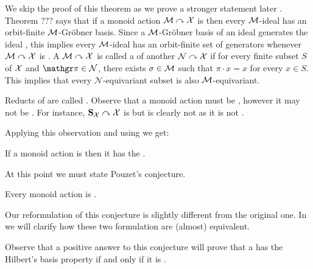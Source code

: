 %
We skip the proof of this theorem as we prove a stronger statement later .
Theorem ??? says that if a monoid action $\mathcal{M}\curvearrowright\mathcal{X}$ is  then every $\mathcal{M}$-ideal has an orbit-finite $\mathcal{M}$-Gr\"{o}bner basis.
Since a $\mathcal{M}$-Gr\"{o}bner basis of an ideal generates the ideal ,
this implies every $\mathcal{M}$-ideal has an orbit-finite set of generators whenever $\mathcal{M}\curvearrowright\mathcal{X}$ is .
%
A  $\mathcal{M}\curvearrowright\mathcal{X}$ is called a  of another  $\mathcal{N}\curvearrowright\mathcal{X}$ if for every finite subset $S$ of $\mathcal{X}$ and $\gelem\in\mathcal{N}$,
there exists $\sigma\in\mathcal{M}$ such that $\pi\cdot x = x$ for every $x\in S$.
This implies that every $\mathcal{N}$-equivariant subset is also $\mathcal{M}$-equivariant.

Reducts of   are called .
Observe that a  monoid action must be ,
however it may not be .
For instance, $\mathbf{S}_{\mathcal{X}}\curvearrowright\mathcal{X}$ is  but is clearly not  as it is not .

Applying this observation and using  we get:
%
\begin{corollary}
If a monoid action is  then it has the .
\end{corollary}
%
At this point we must state Pouzet's conjecture.
%
\begin{conjecture}
Every  monoid action is .
\end{conjecture}
%
\begin{remark}
\end{remark}
%
Our reformulation of this conjecture is slightly different from the original one.
In  we will clarify how these two formulation are (almost) equivalent. 

Observe that a positive answer to this conjecture will prove that a  has the Hilbert's basis property if and only if it is .